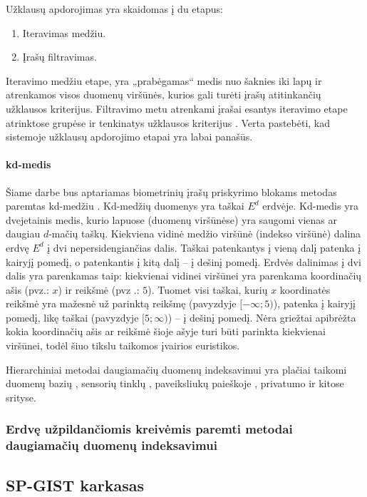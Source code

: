 
Užklausų apdorojimas yra skaidomas į du etapus:
\begin{enumerate}
	\item Iteravimas medžiu.
	\item Įrašų filtravimas.
\end{enumerate}
Iteravimo medžiu etape, yra „prabėgamas“ medis nuo šaknies iki lapų ir atrenkamos visos duomenų viršūnės, kurios gali turėti įrašų atitinkančių užklausos kriterijus.
Filtravimo metu atrenkami įrašai esantys iteravimo etape atrinktose grupėse ir tenkinatys užklausos kriterijus \cite{brinkhoff1994multi} \cite{bohm2001searching}.
Verta pastebėti, kad sistemoje \cite{NeurotechnologyMegamatcherAccelerator} užklausų apdorojimo etapai yra labai panašūs.

\paragraph{kd-medis}

Šiame darbe bus aptariamas biometrinių įrašų priskyrimo blokams metodas paremtas kd-medžiu \cite{bentley1979multidimensional}.
Kd-medžių duomenys yra taškai $E^d$ erdvėje.
Kd-medis yra dvejetainis medis, kurio lapuose (duomenų viršūnėse) yra saugomi vienas ar daugiau $d$-mačių taškų.
Kiekviena vidinė medžio viršūnė (indekso viršūnė) dalina erdvę $E^d$ į dvi nepersidengiančias dalis.
Taškai patenkantys į vieną dalį patenka į kairyjį pomedį, o patenkantis į kitą dalį -- į dešinį pomedį.
Erdvės dalinimas į dvi dalis yra parenkamas taip: kiekvienai vidinei viršūnei yra parenkama koordinačių ašis (pvz.: $x$) ir reikšmė (pvz .: $5$).
Tuomet visi taškai, kurių $x$ koordinatės reikšmė yra mažesnė už parinktą reikšmę (pavyzdyje $[-\infty; 5)$), patenka į kairyjį pomedį, likę taškai (pavyzdyje $[5; \infty)$) -- į dešinį pomedį.
Nėra griežtai apibrėžta kokia koordinačių ašis ar reikšmė šioje ašyje turi būti parinkta kiekvienai viršūnei, todėl šiuo tikslu taikomos įvairios euristikos.


Hierarchiniai metodai daugiamačių duomenų indeksavimui yra plačiai taikomi duomenų bazių \cite{bohm2001searching}, sensorių tinklų \cite{li2003multi}, paveiksliukų paieškoje \cite{silpa2008optimised}, privatumo \cite{hore2012secure} \cite{xiao2010differentially} ir kitose srityse.

\subsubsection{Erdvę užpildančiomis kreivėmis paremti metodai daugiamačių duomenų indeksavimui}


\subsection{SP-GIST karkasas}
